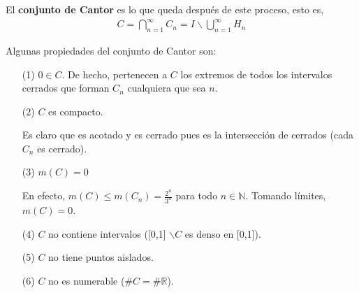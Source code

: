 El \textbf{conjunto de Cantor} es lo que queda después de este proceso, esto es,
\begin{align*}
    C = \bigcap_{n=1}^{\infty}{C_n} = I \backslash \bigcup_{n=1}^{\infty}{H_n}
\end{align*}

Algunas propiedades del conjunto de Cantor son:
\begin{enumerate}
    \item[(1)] $0 \in C$. De hecho, pertenecen a $C$ los extremos de todos los intervalos cerrados que forman $C_n$ cualquiera que sea $n$.
    \item[(2)] $C$ es compacto.

          Es claro que es acotado y es cerrado pues es la intersección de cerrados (cada $C_n$ es cerrado).
    \item[(3)] $m(C) = 0$

          En efecto, $m(C) \leq m(C_n) = \frac{2^n}{3^n}$ para todo $n \in \mathbb{N}$. Tomando límites, $m(C) = 0$.
    \item[(4)] $C$ no contiene intervalos ([0,1] $\backslash C$ es denso en [0,1]).
    \item[(5)] $C$ no tiene puntos aislados.
    \item[(6)] $C$ no es numerable ($\#C = \#\mathbb{R}$).


\end{enumerate}
